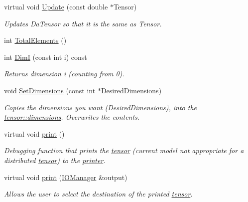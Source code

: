 \begin{DoxyCompactItemize}
virtual void \hyperlink{classJKBuilder_1_1tensor_a10ffea2bf428adfa3e8319646c44a3c6}{Update} (const double $\ast$Tensor)
\begin{DoxyCompactList}\small\item\em Updates DaTensor so that it is the same as Tensor. \item\end{DoxyCompactList}\item 
int \hyperlink{classJKBuilder_1_1tensor_a537b2f14296e2f0e62f00e1703c5fa08}{TotalElements} ()
\item 
int \hyperlink{classJKBuilder_1_1tensor_a6bdcfca6493bc217b607317dbceb28b2}{DimI} (const int i) const 
\begin{DoxyCompactList}\small\item\em Returns dimension i (counting from 0). \item\end{DoxyCompactList}\item 
void \hyperlink{classJKBuilder_1_1tensor_ace6bcf62c74395ab9e37abc4935f66e0}{SetDimensions} (const int $\ast$DesiredDimensions)
\begin{DoxyCompactList}\small\item\em Copies the dimensions you want (DesiredDimensions), into the \hyperlink{classJKBuilder_1_1tensor_a2ce1e6e0782ddee097f2c4aa2663d3e9}{tensor::dimensions}. Overwrites the contents. \item\end{DoxyCompactList}\item 
virtual void \hyperlink{classJKBuilder_1_1tensor_a388f572c62279f839ee138a9afbdeeb5}{print} ()
\begin{DoxyCompactList}\small\item\em Debugging function that prints the \hyperlink{classJKBuilder_1_1tensor}{tensor} (current model not appropriate for a distributed \hyperlink{classJKBuilder_1_1tensor}{tensor}) to the \hyperlink{classJKBuilder_1_1printer}{printer}. \item\end{DoxyCompactList}\item 
virtual void \hyperlink{classJKBuilder_1_1tensor_a74b2fe351a5444c1325870dc6162f451}{print} (\hyperlink{classJKBuilder_1_1IOManager}{IOManager} \&output)
\begin{DoxyCompactList}\small\item\em Allows the user to select the destination of the printed \hyperlink{classJKBuilder_1_1tensor}{tensor}. \item\end{DoxyCompactList}\item 

\end{DoxyCompactItemize}
